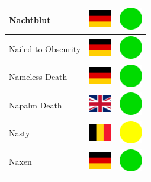 \documentclass[12pt, a4paper, twoside]{report}
\begin{document}
\begin{center}
\begin{longtable}{|p{5cm}|p{2cm}|p{2cm}|}
 Nachtblut                                                  & \includegraphics[width=1cm]{../4x3/de} &   \includegraphics[width=1cm]{../likes/y} \\ \hline
 Nailed to Obscurity                                        & \includegraphics[width=1cm]{../4x3/de} &   \includegraphics[width=1cm]{../likes/y} \\ \hline
 Nameless Death                                             & \includegraphics[width=1cm]{../4x3/de} &   \includegraphics[width=1cm]{../likes/y} \\ \hline
 Napalm Death                                               & \includegraphics[width=1cm]{../4x3/gb} &   \includegraphics[width=1cm]{../likes/y} \\ \hline
 Nasty                                                      & \includegraphics[width=1cm]{../4x3/be} &   \includegraphics[width=1cm]{../likes/m} \\ \hline
 Naxen                                                      & \includegraphics[width=1cm]{../4x3/de} &   \includegraphics[width=1cm]{../likes/y} \\ \hline

\end{longtable}
\end{center}
\end{document}
